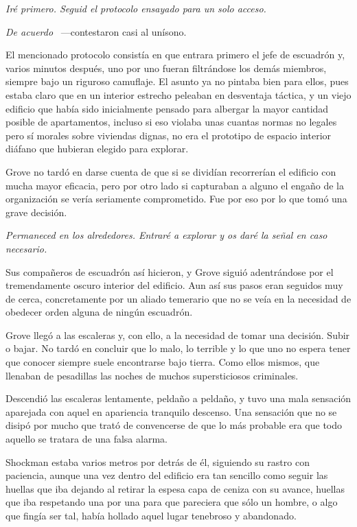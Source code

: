 \emph{Iré primero. Seguid el protocolo ensayado para un solo acceso.}

\emph{De acuerdo} ~---contestaron casi al unísono.

El mencionado protocolo consistía en que entrara primero el jefe de escuadrón y, varios minutos después, uno por uno fueran filtrándose los demás miembros, siempre bajo un riguroso camuflaje. El asunto ya no pintaba bien para ellos, pues estaba claro que en un interior estrecho peleaban en desventaja táctica, y un viejo edificio que había sido inicialmente pensado para albergar la mayor cantidad posible de apartamentos, incluso si eso violaba unas cuantas normas no legales pero sí morales sobre viviendas dignas, no era el prototipo de espacio interior diáfano que hubieran elegido para explorar.

Grove no tardó en darse cuenta de que si se dividían recorrerían el edificio con mucha mayor eficacia, pero por otro lado si capturaban a alguno el engaño de la organización se vería seriamente comprometido. Fue por eso por lo que tomó una grave decisión.

\emph{Permaneced en los alrededores. Entraré a explorar y os daré la señal en caso necesario.}

Sus compañeros de escuadrón así hicieron, y Grove siguió adentrándose por el tremendamente oscuro interior del edificio. Aun así sus pasos eran seguidos muy de cerca, concretamente por un aliado temerario que no se veía en la necesidad de obedecer orden alguna de ningún escuadrón.

Grove llegó a las escaleras y, con ello, a la necesidad de tomar una decisión. Subir o bajar. No tardó en concluir que lo malo, lo terrible y lo que uno no espera tener que conocer siempre suele encontrarse bajo tierra. Como ellos mismos, que llenaban de pesadillas las noches de muchos supersticiosos criminales.

Descendió las escaleras lentamente, peldaño a peldaño, y tuvo una mala sensación aparejada con aquel en apariencia tranquilo descenso. Una sensación que no se disipó por mucho que trató de convencerse de que lo más probable era que todo aquello se tratara de una falsa alarma.

Shockman estaba varios metros por detrás de él, siguiendo su rastro con paciencia, aunque una vez dentro del edificio era tan sencillo como seguir las huellas que iba dejando al retirar la espesa capa de ceniza con su avance, huellas que iba respetando una por una para que pareciera que sólo un hombre, o algo que fingía ser tal, había hollado aquel lugar tenebroso y abandonado.

